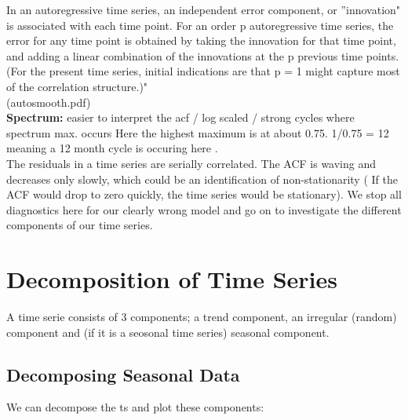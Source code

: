 \documentclass[11pt, a4paper]{article} %
\begin{document}
\noindent In an autoregressive time series, an independent error component, or ''innovation" is associated with each time point. For an order p autoregressive time series, the error for any time point is obtained by taking the innovation for that time point, and adding a linear combination of the innovations at the p previous time points. (For the present time series, initial indications are that p = 1 might capture most of the correlation structure.)"\\ (autosmooth.pdf)\\

\noindent \textbf{Spectrum:} easier to interpret the acf / log scaled / strong cycles where spectrum max. occurs 
Here the highest maximum is at about 0.75. 1/0.75 = 12 meaning a 12 month cycle is occuring here .\\

\noindent The residuals in a time series are serially correlated. The ACF is waving and decreases only slowly, which could be an identification of non-stationarity ( If the ACF would drop to zero quickly, the time series would be stationary). We stop all diagnostics here for our clearly wrong model and go on to investigate the different components of our time series.\\


\section{Decomposition of Time Series}%
A time serie consists of 3 components; a trend component, an irregular (random) component and (if it is a seosonal time series) seasonal component.
\subsection{Decomposing Seasonal Data}%

\noindent We can decompose the ts and plot these components:
\end{document}
